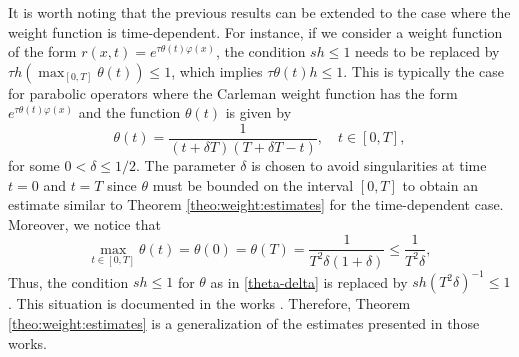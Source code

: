 \documentclass[11pt,oneside,leqno]{amsart}
\numberwithin{equation}{section}
\numberwithin{equation}{section}
\begin{document}
It is worth noting that the previous results can be extended to the case where the weight function is time-dependent. For instance, if we consider a weight function of the form $r(x,t)=e^{\tau\theta(t)\varphi(x)}$, the condition $sh\leq 1$ needs to be replaced by $\tau h(\max_{[0,T]}\theta(t))\leq 1$, which implies $\tau\theta(t)h\leq 1$. This is typically the case for parabolic operators where the Carleman weight function has the form $e^{\tau\theta(t)\varphi(x)}$ and the function $\theta(t)$ is given by 
\begin{equation}\label{theta-delta}
    \theta(t)=\frac{1}{(t+\delta T)(T+\delta T-t)},\quad t\in [0,T],
\end{equation}
for some $0<\delta \leq 1/2$. The parameter $\delta$ is chosen to avoid singularities at time $t=0$ and $t=T$ since $\theta$ must be bounded on the interval $[0,T]$ to obtain an estimate similar to Theorem \ref{theo:weight:estimates} for the time-dependent case. Moreover, we notice that
\begin{equation}\label{eq:theta} 
\max_{t\in [0,T]} \theta(t)=\theta(0)=\theta(T)=\frac{1}{T^{2}\delta(1+\delta)}\leq \frac{1}{T^{2}\delta}, 
\end{equation}
 Thus, the condition $sh\leq 1$ for $\theta$ as in \eqref{theta-delta} is replaced by $sh(T^{2}\delta)^{-1}\leq 1$. This situation is documented in the works \cite{boyer-2014,GC-HS-2021,LMPZ:2023}. Therefore, Theorem \ref{theo:weight:estimates} is a generalization of the estimates presented in those works.
 
\end{document}
